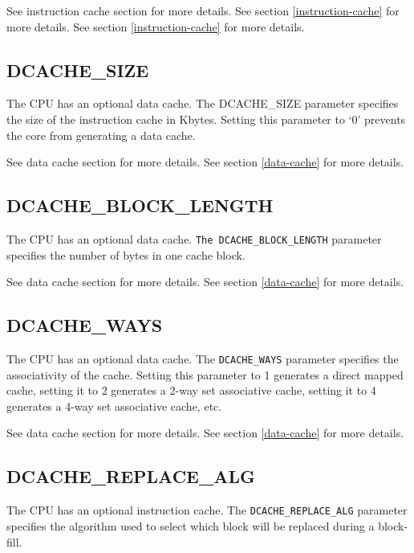 \ifdefined\MARKDOWN
See instruction cache section for more details.
\else
See section \ref{instruction-cache}  for more details.
\fi
See section \ref{instruction-cache}  for more details.

\subsection{DCACHE\_SIZE}\label{dcache_size}

The CPU has an optional data cache. The DCACHE\_SIZE parameter specifies the
size of the instruction cache in Kbytes. Setting this parameter to `0' prevents
the core from generating a data cache.

\ifdefined\MARKDOWN
See data cache section for more details.
\else
See section \ref{data-cache}  for more details.
\fi

\subsection{DCACHE\_BLOCK\_LENGTH}\label{dcache_block_length}

The CPU has an optional data cache. \texttt{The DCACHE\_BLOCK\_LENGTH} parameter
specifies the number of bytes in one cache block.

\ifdefined\MARKDOWN
See data cache section for more details.
\else
See section \ref{data-cache}  for more details.
\fi

\subsection{DCACHE\_WAYS}\label{dcache_ways}

The CPU has an optional data cache. The \texttt{DCACHE\_WAYS} parameter
specifies the associativity of the cache. Setting this parameter to 1 generates
a direct mapped cache, setting it to 2 generates a 2-way set associative cache,
setting it to 4 generates a 4-way set associative cache, etc.

\ifdefined\MARKDOWN
See data cache section for more details.
\else
See section \ref{data-cache}  for more details.
\fi

\subsection{DCACHE\_REPLACE\_ALG}\label{dcache_replace_alg}

The CPU has an optional instruction cache. The \texttt{DCACHE\_REPLACE\_ALG}
parameter specifies the algorithm used to select which block will be
replaced during a block-fill.

